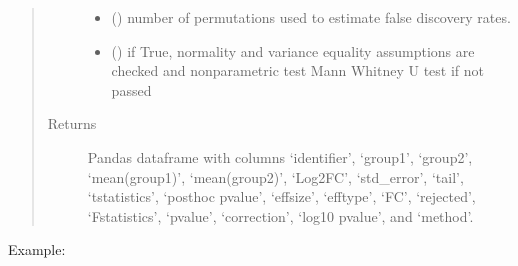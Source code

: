 \documentclass[letterpaper,10pt,english]{sphinxmanual}
\begin{document}
\begin{fulllineitems}
\begin{quote}
\begin{description}
\begin{itemize}
\item {} 
 () \textendash{} number of permutations used to estimate false discovery rates.

\item {} 
 () \textendash{} if True, normality and variance equality assumptions are checked and non\sphinxhyphen{}parametric test Mann Whitney U test if not passed

\end{itemize}

\item[{Returns}] \leavevmode
Pandas dataframe with columns ‘identifier’, ‘group1’, ‘group2’, ‘mean(group1)’, ‘mean(group2)’, ‘Log2FC’, ‘std\_error’, ‘tail’, ‘t\sphinxhyphen{}statistics’, ‘posthoc pvalue’, ‘effsize’, ‘efftype’, ‘FC’, ‘rejected’, ‘F\sphinxhyphen{}statistics’, ‘p\sphinxhyphen{}value’, ‘correction’, ‘\sphinxhyphen{}log10 p\sphinxhyphen{}value’, and ‘method’.

\end{description}\end{quote}

Example:

\begin{sphinxVerbatim}[commandchars=\\\{\}]
    \PYG{p}{[}\PYG{p}{]}   
\end{sphinxVerbatim}

\end{fulllineitems}

\end{document}
